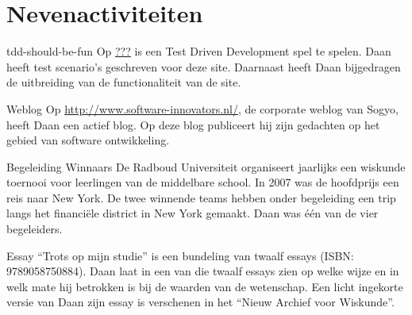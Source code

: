 \section*{Nevenactiviteiten}

	\begin{subActivityList}
		\item[tdd-should-be-fun] Op \url{???} is een Test Driven Development spel
		te spelen. Daan heeft test scenario's geschreven voor deze site. 
		Daarnaast heeft Daan bijgedragen de uitbreiding van de functionaliteit
		van de site.\hfill\\
	
		\item[Weblog] Op \url{http://www.software-innovators.nl/}, de corporate
		weblog van Sogyo, heeft Daan een actief blog. Op deze blog publiceert 
		hij zijn gedachten op het gebied van software ontwikkeling.
		\hfill\\
		
		\item[Begeleiding Winnaars] De Radboud Universiteit organiseert 
		jaarlijks een wiskunde toernooi voor leerlingen van de middelbare 
		school. In 2007 was de hoofdprijs een reis naar New York. De twee 
		winnende teams hebben onder begeleiding een trip langs het financi\"ele 
		district in New York gemaakt. Daan was \'e\'en van de vier begeleiders.
		\hfill\\
		
		\item[Essay] ``Trots op mijn studie'' is een bundeling van twaalf essays 
		(ISBN: 9789058750884). Daan laat in een van die twaalf essays zien op 
		welke wijze en in welk mate hij betrokken is bij de waarden van de 
		wetenschap.
		Een licht ingekorte versie van Daan zijn essay is verschenen in het 
		``Nieuw Archief voor Wiskunde''.		
		\hfill\\
	\end{subActivityList}

